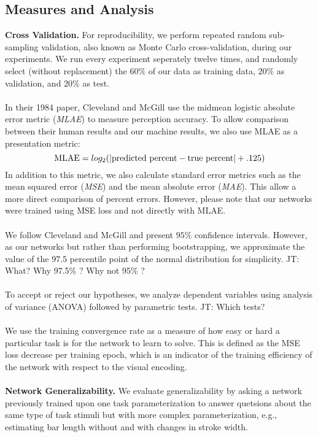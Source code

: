 \subsection{Measures and Analysis}

\noindent\textbf{Cross Validation.} For reproducibility, we perform repeated random sub-sampling validation, also known as Monte Carlo cross-validation, during our experiments. We run every experiment seperately twelve times, and randomly select (without replacement) the $60\%$ of our data as training data, $20\%$ as validation, and $20\%$ as test. 
\\~\\
 In their 1984 paper, Cleveland and McGill use the midmean logistic absolute error metric (\emph{MLAE}) to measure perception accuracy. To allow comparison between their human results and our machine results, we also use MLAE as a presentation metric:
\begin{equation}
	\textnormal{MLAE} = log_2( | \textnormal{predicted percent} - \textnormal{true percent} | + .125)
\end{equation}
In addition to this metric, we also calculate standard error metrics such as the mean squared error (\emph{MSE}) and the mean absolute error (\emph{MAE}). This allow a more direct comparison of percent errors. However, please note that our networks were trained using MSE loss and not directly with MLAE.
\\~\\
 We follow Cleveland and McGill and present $95\%$ confidence intervals. However, as our networks but rather than performing bootstrapping, we approximate the value of the $97.5$ percentile point of the normal distribution for simplicity. JT: What? Why 97.5\% ? Why not 95\% ?
\\~\\
 To accept or reject our hypotheses, we analyze dependent variables using analysis of variance (ANOVA) followed by parametric tests. JT: Which tests?
\\~\\
 We use the training convergence rate as a measure of how easy or hard a particular task is for the network to learn to solve. This is defined as the MSE loss decrease per training epoch, which is an indicator of the training efficiency of the network with respect to the visual encoding.
\\~\\
\noindent\textbf{Network Generalizability.} We evaluate generalizability by asking a network previously trained upon one task parameterization to answer quetsions about the same type of task stimuli but with more complex parameterization, e.g., estimating bar length without and with changes in stroke width.

